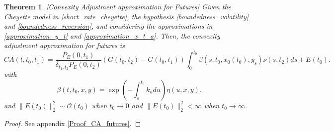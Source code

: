\documentclass[a4paper,10pt]{article}
\newtheorem{theorem}{Theorem}[section]
\newcommand{\1}{\mathbf{1}}
\begin{document}
\begin{theorem}\label{Th_CA_futures}[Convexity Adjustment approximation for Futures]
Given the Cheyette model in \eqref{short_rate_cheyette}, the hypothesis \ref{boundedness_volatility} and \ref{boundedness_reversion}, and considering the approximations in \eqref{approximation_y_t} and \eqref{approximation_x_t_a}. Then, the convexity adjustment approximation for futures is 
\begin{equation}\label{ca_approximation_futures}
CA(t,t_0,t_1) = \frac{P_{E}(0,t_1)}{\delta_{t_1,t_2} P_{E}(0,t_2)} \left(G(t_0,t_2)  - G(t_0,t_1) \right) \int_{0}^{t_0} \beta(s,t_0,\bar{x}_0(t_0),\bar{y}_s) \nu(s,t_2) ds + E(t_0). 
\end{equation}
with 
\begin{equation*}
\beta(t,t_0,x,y) = \exp\left(-\int_{s}^{t_0}k_u du \right) \eta(u,x,y).
\end{equation*}
and $\|E\left(t_0\right)\|^{2}_{2} \sim \mathcal{O}(t_0)$ when $t_0 \to 0$ and $\|E\left(t_0\right)\|^{2}_{2} < \infty$ when $t_0 \to \infty$. 
\end{theorem}
\begin{proof}
See appendix \ref{Proof_CA_futures}.
\end{proof}
\end{document}
